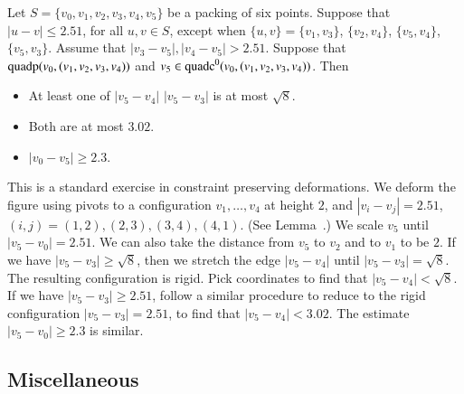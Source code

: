 \begin{tarskidata}
\begin{tarski}
\begin{lemma}
Let $S=\{v_0,v_1,v_2,v_3,v_4,v_5\}$ be a packing of six points.  
Suppose that $|u-v|\le 2.51$, for all $u,v\in S$, 
except
when $\{u,v\}=\{v_1,v_3\}$, $\{v_2,v_4\}$, $\{v_5,v_4\}$,
$\{v_5,v_3\}$.  
Assume that $|v_3-v_5|,|v_4-v_5|>2.51$.
Suppose that ${\operatorname{quadp}}(v_0,(v_1,v_2,v_3,v_4))$
and $v_5\in{\operatorname{quadc}}^0(v_0,(v_1,v_2,v_3,v_4))$.
Then
\begin{itemize}
  \item At least one of $|v_5-v_4|$ $|v_5-v_3|$ is at most $\sqrt8$.
    \item Both are at most $3.02$.
  \item $|v_0-v_5|\ge 2.3$.
\end{itemize}
\end{lemma}

\begin{proved}
This is a standard exercise in constraint preserving deformations.
We deform the figure using pivots to a configuration
$v_1,\ldots,v_4$ at height $2$, and $|v_i-v_j|=2.51$,
$(i,j)=(1,2),(2,3),(3,4),(4,1)$. (See Lemma~.)
We scale $v_5$ until $|v_5-v_0|=2.51
$. We can also take the distance from $v_5$ to $v_2$ and to $v_1$
to be $2$. If we have $|v_5-v_3|\ge \sqrt{8}$, then we stretch
the edge $|v_5-v_4|$ until $|v_5-v_3|=\sqrt{8}$. The resulting
configuration is rigid.  Pick coordinates to find that
$|v_5-v_4|<\sqrt{8}$. If we have $|v_5-v_3|\ge 2.51 $, follow a
similar procedure to reduce to the rigid configuration
$|v_5-v_3|=2.51$, to find that $|v_5-v_4|<3.02$. The estimate
$|v_5-v_0|\ge2.3$ is similar.
\swallowed\end{proved}
\end{tarski}












\begin{tarski}
\section{Miscellaneous}



\end{tarski}
\end{tarskidata}
